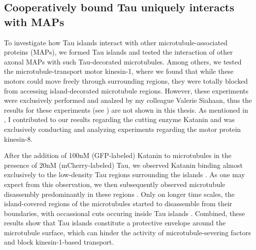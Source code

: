 \FloatBarrier
\subsection{Cooperatively bound Tau uniquely interacts with MAPs}
To investigate how Tau islands interact with other microtubule-associated proteins (MAPs), we formed Tau islands and tested the interaction of other axonal MAPs with such Tau-decorated microtubules. Among others, we tested the microtubule-transport motor kinesin-1, where we found that while these motors could move freely through surrounding regions, they were totally blocked from accessing island-decorated microtubule regions. However, these experiments were exclusively performed and analzed by my colleague Valerie Siahaan, thus the results for these experiments (see \cite{Siahaan2019a}) are not shown in this thesis. As mentioned in , I contributed to our results regarding the cutting enzyme Katanin and was exclusively conducting and analyzing experiments regarding the motor protein kinesin-8.\par

After the addition of 100nM (GFP-labeled) Katanin to microtubules in the presence of 20nM (mCherry-labeled) Tau, we observed Katanin binding almost exclusively to the low-density Tau regions surrounding the islands . As one may expect from this observation, we then subsequently observed microtubule disassembly predominantly in these regions . Only on longer time scales, the island-covered regions of the microtubules started to disassemble from their boundaries, with occassional cuts occuring inside Tau islands . Combined, these results show that Tau islands constitute a protective envelope around the microtubule surface, which can hinder the activity of microtubule-severing factors and block kinesin-1-based transport. \par

